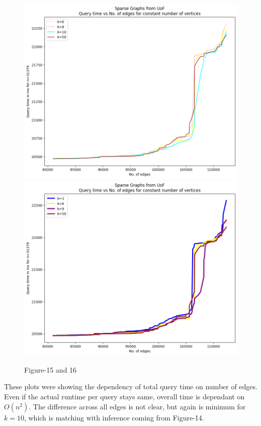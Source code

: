 \documentclass[12pt, a4paper]{article}
\begin{document}
\begin{figure}[H]
    \caption*{Figure-15 and 16}    
        \centering
    \includegraphics[scale=0.5]{./sparse/11}
        \includegraphics[scale=0.5]{./sparse/13}
    \end{figure}
These plots were showing the dependency of total query time on number of edges. Even if the actual runtime per query stays same, overall time is dependant on $O(n^2)$. The difference across all edges is not clear, but again is minimum for $k=10$, which is matching with inference coming from Figure-14.
\\\\
\end{document}
